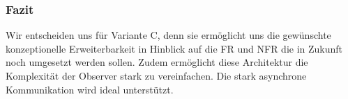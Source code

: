 \subsubsection{Fazit}
Wir entscheiden uns für Variante C, denn sie ermöglicht uns die gewünschte konzeptionelle Erweiterbarkeit in Hinblick auf die \ac{FR} und \ac{NFR} die in Zukunft noch umgesetzt werden sollen. Zudem ermöglicht diese Architektur die Komplexität der Observer stark zu vereinfachen. Die stark asynchrone Kommunikation wird ideal unterstützt.